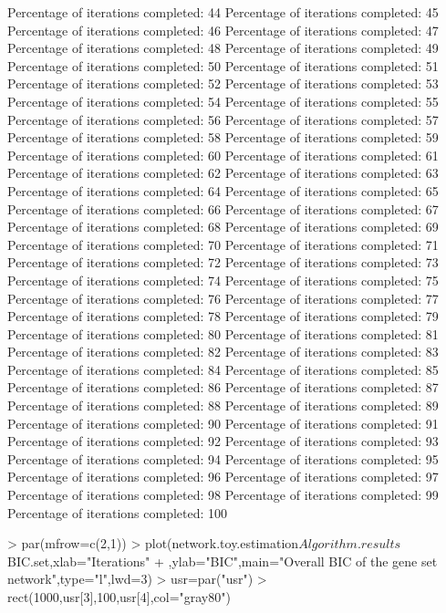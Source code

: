\documentclass[12pt]{article}
\begin{document}
\begin{Schunk}
\begin{Soutput}
Percentage of iterations completed: 44 
Percentage of iterations completed: 45 
Percentage of iterations completed: 46 
Percentage of iterations completed: 47 
Percentage of iterations completed: 48 
Percentage of iterations completed: 49 
Percentage of iterations completed: 50 
Percentage of iterations completed: 51 
Percentage of iterations completed: 52 
Percentage of iterations completed: 53 
Percentage of iterations completed: 54 
Percentage of iterations completed: 55 
Percentage of iterations completed: 56 
Percentage of iterations completed: 57 
Percentage of iterations completed: 58 
Percentage of iterations completed: 59 
Percentage of iterations completed: 60 
Percentage of iterations completed: 61 
Percentage of iterations completed: 62 
Percentage of iterations completed: 63 
Percentage of iterations completed: 64 
Percentage of iterations completed: 65 
Percentage of iterations completed: 66 
Percentage of iterations completed: 67 
Percentage of iterations completed: 68 
Percentage of iterations completed: 69 
Percentage of iterations completed: 70 
Percentage of iterations completed: 71 
Percentage of iterations completed: 72 
Percentage of iterations completed: 73 
Percentage of iterations completed: 74 
Percentage of iterations completed: 75 
Percentage of iterations completed: 76 
Percentage of iterations completed: 77 
Percentage of iterations completed: 78 
Percentage of iterations completed: 79 
Percentage of iterations completed: 80 
Percentage of iterations completed: 81 
Percentage of iterations completed: 82 
Percentage of iterations completed: 83 
Percentage of iterations completed: 84 
Percentage of iterations completed: 85 
Percentage of iterations completed: 86 
Percentage of iterations completed: 87 
Percentage of iterations completed: 88 
Percentage of iterations completed: 89 
Percentage of iterations completed: 90 
Percentage of iterations completed: 91 
Percentage of iterations completed: 92 
Percentage of iterations completed: 93 
Percentage of iterations completed: 94 
Percentage of iterations completed: 95 
Percentage of iterations completed: 96 
Percentage of iterations completed: 97 
Percentage of iterations completed: 98 
Percentage of iterations completed: 99 
Percentage of iterations completed: 100 
\end{Soutput}
\begin{Sinput}
> par(mfrow=c(2,1))
> plot(network.toy.estimation$Algorithm.results$BIC.set,xlab="Iterations"
+      ,ylab="BIC",main="Overall BIC of the gene set network",type="l",lwd=3)
> usr=par("usr")
> rect(1000,usr[3],100,usr[4],col="gray80")

\end{Sinput}
\end{Schunk}
\end{document}
